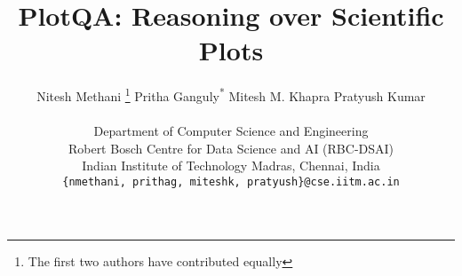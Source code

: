 \documentclass[10pt,twocolumn,letterpaper]{article}
\begin{document}
\newcommand{\MK}[1]{\textcolor{black}{#1}}
\newcommand{\PN}[1]{\textcolor{black}{#1}}

\title{PlotQA: Reasoning over Scientific Plots}

\author{Nitesh Methani \thanks{The first two authors have contributed equally} \hspace{1cm} Pritha Ganguly\textsuperscript{*} \hspace{1cm} Mitesh M. Khapra \hspace{1cm} Pratyush Kumar \\\\
Department of Computer Science and Engineering\\
Robert Bosch Centre for Data Science and AI (RBC-DSAI)\\
Indian Institute of Technology Madras, Chennai, India\\
{\tt\small \{nmethani, prithag, miteshk, pratyush\}@cse.iitm.ac.in}
}


\newcommand{\revision}[1][\textcolor{black}]{#1}\newcommand{\delete}[1][\textcolor{b}]{#1}

\maketitle
\ifwacvfinal\thispagestyle{empty}\fi
\end{document}
